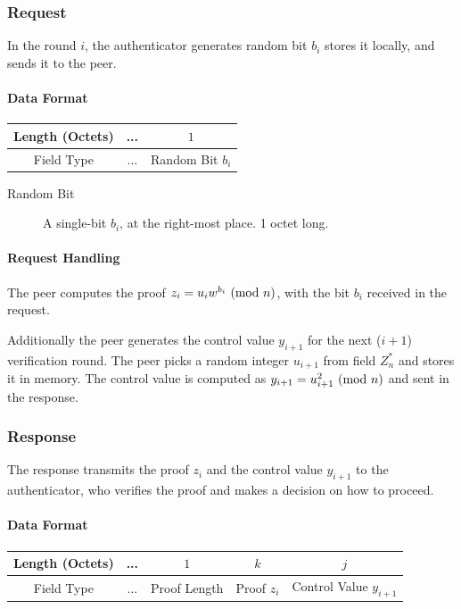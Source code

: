 \subsubsection{Request}
In the round $i$, the authenticator generates random bit $b_i$ stores it locally, and sends it to the peer.
\paragraph{Data Format}

\begin{center}
\begin{tabular}{|c|c|c|}
	\hline
	Length (Octets) & ... & $1$ \\
	\hline
	Field Type & ... & Random Bit $b_i$\\
	\hline
\end{tabular}
\end{center}

\begin{description}
	\item[Random Bit] A single-bit $b_i$, at the right-most place. 1 octet long.
\end{description}

\paragraph{Request Handling}
The peer computes the proof $z_i = u_iw^{b_i} \ (\mathrm{mod}\ n)$, with the bit $b_i$ received in the request.

Additionally the peer generates the control value $y_{i+1}$ for the next ($i+1$) verification round.
The peer picks a random integer $u_{i+1}$ from field $Z^*_n$ and stores it in memory.
The control value is computed as $y_{i+1} = u_{i+1}^2 \ (\mathrm{mod}\ n)$ and sent in the response.

\subsubsection{Response}

The response transmits the proof $z_i$ and the control value $y_{i+1}$ to the authenticator, who verifies the proof and makes a decision on how to proceed.
\paragraph{Data Format}

\begin{center}
\begin{tabular}{|c|c|c|c|c|}
	\hline
	Length (Octets) & ... & $1$ & $k $ & $j$\\
	\hline
	Field Type & ... & Proof Length & Proof $z_i$ & Control Value $y_{i+1}$\\
	\hline
\end{tabular}
\end{center}

